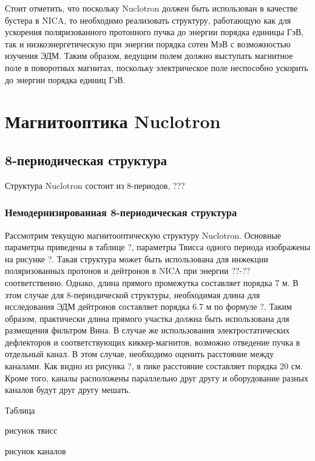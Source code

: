 \noindent Стоит отметить, что поскольку Nuclotron должен быть использован в качестве бустера в NICA, то необходимо реализовать структуру, работающую как для ускорения поляризованного протонного пучка до энергии порядка единицы ГэВ, так и низкоэнергетическую при энергии порядка сотен МэВ с возможностью изучения ЭДМ. Таким образом, ведущим полем должно выступать магнитное поле в поворотных магнитах, поскольку электрическое поле неспособно ускорить до энергии порядка единиц ГэВ. 	
	
	
	\section{Магнитооптика Nuclotron}\label{sec:EDM/optics}
	\subsection{8-периодическая структура}\label{sec:EDM/optics/8period}
\par Структура Nuclotron состоит из 8-периодов, ???

	\subsubsection{Немодернизированная 8-периодическая структура}\label{sec:EDM/requirements/8period/native}
\par Рассмотрим текущую магнитооптическую структуру Nuclotron. Основные параметры приведены в таблице ?, параметры Твисса одного периода изображены на рисунке ?. Такая структура может быть использована для инжекции поляризованных протонов и дейтронов в NICA при энергии ??-?? соответственно. Однако, длина прямого промежутка составляет порядка 7 м. В этом случае для 8-периодической структуры, необходимая длина для исследования ЭДМ дейтронов составляет порядка 6.7 м по формуле ?. Таким образом, практически длина прямого участка должна быть использована для размещения фильтром Вина. В случае же использования электростатических дефлекторов и соответствующих киккер-магнитов, возможно отведение пучка в отдельный канал. В этом случае, необходимо оценить расстояние между каналами. Как видно из рисунка ?, в пике расстояние составляет порядка 20 см. Кроме того, каналы расположены параллельно друг другу и оборудование разных каналов будут друг другу мешать.

Таблица

рисунок твисс

рисунок каналов
 
